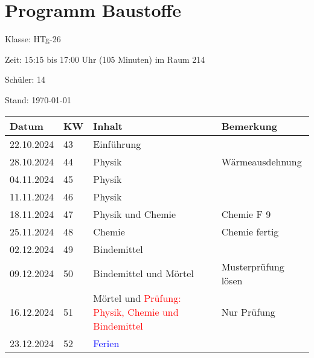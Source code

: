 \documentclass[
11pt,
captions=tableheading,
headings=big,
headsepline,
footsepline, 
captions=tableheading,
parskip=half-,
]{scrartcl}
\title{\fach}
\date{2024}
\newcommand{\klasse}{HTg-26\xspace}
\newcommand{\red}[1]{\textcolor{red}{#1}}
\begin{document}
\section*{Programm Baustoffe}

Klasse: \klasse

Zeit: 15:15 bis 17:00 Uhr (105 Minuten) im Raum 214

Schüler: 14



Stand: \today

\vspace{1cm}



\begin{table}[H]
    \centering
    \begin{tabular}{llp{8cm}p{4cm}}
        \toprule
        \textbf{Datum} & \textbf{KW} & \textbf{Inhalt}                                          & \textbf{Bemerkung}  \\
        \midrule
        22.10.2024     & 43          & Einführung                                               & {}                  \\
        28.10.2024     & 44          & Physik                                                   & Wärmeausdehnung     \\
        04.11.2024     & 45          & Physik                                                   & {}                  \\
        11.11.2024     & 46          & Physik                                                   & {}                  \\
        18.11.2024     & 47          & Physik und Chemie                                        & Chemie F 9          \\
        25.11.2024     & 48          & Chemie                                                   & Chemie fertig       \\
        02.12.2024     & 49          & Bindemittel                                              & {}                  \\
        09.12.2024     & 50          & Bindemittel und Mörtel                                   & Musterprüfung lösen \\
        16.12.2024     & 51          & Mörtel und \red{Prüfung: Physik, Chemie und Bindemittel} & Nur Prüfung         \\
        \midrule
        23.12.2024     & 52          & \textcolor{blue}{Ferien}                                                       \\

\end{tabular}
\end{table}
\end{document}
